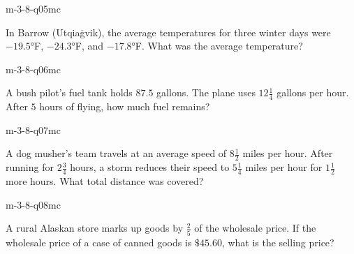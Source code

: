 \begin{practiceQuestion}{m-3-8-q05}{mc}
\begin{questionText}
In Barrow (Utqiaġvik), the average temperatures for three winter days were $-19.5°$F, $-24.3°$F, and $-17.8°$F. What was the average temperature?
\end{questionText}
\end{practiceQuestion}

\begin{practiceQuestion}{m-3-8-q06}{mc}
\begin{questionText}
A bush pilot's fuel tank holds $87.5$ gallons. The plane uses $12\frac{1}{4}$ gallons per hour. After $5$ hours of flying, how much fuel remains?
\end{questionText}
\end{practiceQuestion}

\begin{practiceQuestion}{m-3-8-q07}{mc}
\begin{questionText}
A dog musher's team travels at an average speed of $8\frac{1}{2}$ miles per hour. After running for $2\frac{3}{4}$ hours, a storm reduces their speed to $5\frac{1}{4}$ miles per hour for $1\frac{1}{2}$ more hours. What total distance was covered?
\end{questionText}
\end{practiceQuestion}

\begin{practiceQuestion}{m-3-8-q08}{mc}
\begin{questionText}
A rural Alaskan store marks up goods by $\frac{2}{5}$ of the wholesale price. If the wholesale price of a case of canned goods is $\$45.60$, what is the selling price?
\end{questionText}
\end{practiceQuestion}

